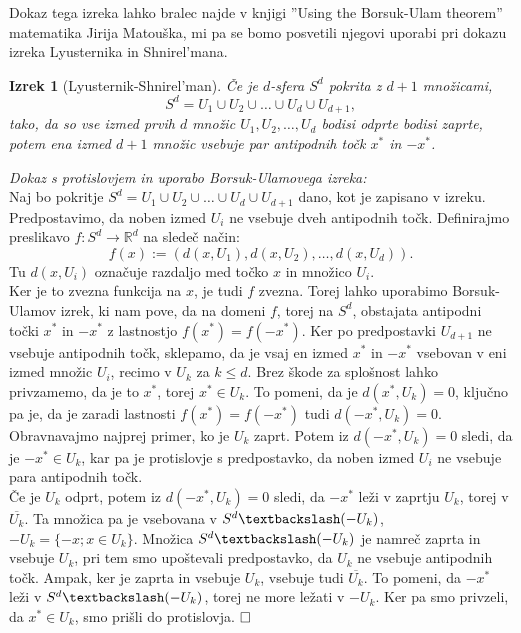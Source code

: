 \documentclass[a4paper,12pt]{article}
\def\qed{$\hfill\Box$}   %
\newtheorem{izrek}{Izrek}
\begin{document}
Dokaz tega izreka lahko bralec najde v knjigi ''Using the Borsuk-Ulam theorem'' matematika Jirija Matouška, mi pa se bomo posvetili njegovi uporabi pri dokazu izreka Lyusternika in Shnirel'mana.

\begin{izrek}[Lyusternik-Shnirel'man]
Če je $d$-sfera $S^d$ pokrita z $d+1$ množicami,
$$S^d = U_1 \cup U_2 \cup \ldots \cup U_d \cup U_{d+1},$$
tako, da so vse izmed prvih $d$ množic $U_1, U_2, \ldots, U_d$ bodisi odprte bodisi zaprte, potem ena izmed $d+1$ množic vsebuje par antipodnih točk $x^*$ in $-x^*$.
\end{izrek}

\noindent
{\em Dokaz s protislovjem in uporabo Borsuk-Ulamovega izreka:} \\
\indent Naj bo pokritje $S^d = U_1 \cup U_2 \cup \ldots \cup U_d \cup U_{d+1}$ dano, kot je zapisano v izreku. Predpostavimo, da noben izmed $U_i$ ne vsebuje dveh antipodnih točk. Definirajmo preslikavo $f:S^d \rightarrow \mathbb{R}^d$ na sledeč način:
$$f(x) := (d(x,U_1), d(x,U_2), \ldots, d(x,U_d)).$$
Tu $d(x,U_i)$ označuje razdaljo med točko $x$ in množico $U_i$. \\
\indent Ker je to zvezna funkcija na $x$, je tudi $f$ zvezna. Torej lahko uporabimo Borsuk-Ulamov izrek, ki nam pove, da na domeni $f$, torej na $S^d$, obstajata antipodni točki $x^*$ in $-x^*$ z lastnostjo $f(x^*)=f(-x^*)$. Ker po predpostavki $U_{d+1}$ ne vsebuje antipodnih točk, sklepamo, da je vsaj en izmed $x^*$ in $-x^*$ vsebovan v eni izmed množic $U_i$, recimo v $U_k$ za $k\leq d$. Brez škode za splošnost lahko privzamemo, da je to $x^*$, torej $x^* \in U_k$. To pomeni, da je $d(x^*, U_k) = 0$, ključno pa je, da je zaradi lastnosti $f(x^*)=f(-x^*)$ tudi $d(-x^*, U_k) = 0$.\\
\indent Obravnavajmo najprej primer, ko je $U_k$ zaprt. Potem iz $d(-x^*, U_k) = 0$ sledi, da je $-x^* \in U_k$, kar pa je protislovje s predpostavko, da noben izmed $U_i$ ne vsebuje para antipodnih točk.\\
\indent Če je $U_k$ odprt, potem iz $d(-x^*, U_k) = 0$ sledi, da $-x^*$ leži v zaprtju $U_k$, torej v $\overline {U_k}$. Ta množica pa je vsebovana v $S^d\textbackslash(-U_k)$, \mbox{$-U_k = \{-x;x \in U_k\}$}. Množica $S^d\textbackslash(-U_k)$ je namreč zaprta in vsebuje $U_k$, pri tem smo upoštevali predpostavko, da $U_k$ ne vsebuje antipodnih točk. Ampak, ker je zaprta in vsebuje $U_k$, vsebuje tudi $\overline {U_k}$. To pomeni, da $-x^*$ leži v  $S^d\textbackslash(-U_k)$, torej ne more ležati v $-U_k$. Ker pa smo privzeli, da $x^* \in U_k$, smo prišli do protislovja. \qed
\end{document}
